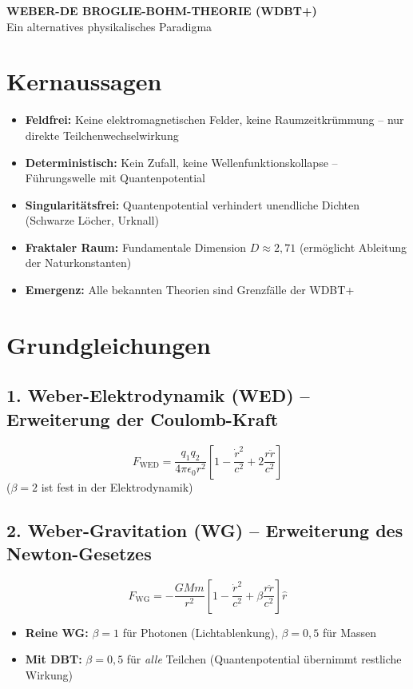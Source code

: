 \documentclass[12pt,a4paper]{article}
\begin{document}
\begin{center}
    \Large\textbf{WEBER-DE BROGLIE-BOHM-THEORIE (WDBT+)} \\
    \large{Ein alternatives physikalisches Paradigma}
\end{center}
\vspace{0.5cm}

\section*{Kernaussagen}
\begin{itemize}
    \item \textbf{Feldfrei:} Keine elektromagnetischen Felder, keine Raumzeitkrümmung -- nur direkte Teilchenwechselwirkung
    \item \textbf{Deterministisch:} Kein Zufall, keine Wellenfunktionskollapse -- Führungswelle mit Quantenpotential
    \item \textbf{Singularitätsfrei:} Quantenpotential verhindert unendliche Dichten (Schwarze Löcher, Urknall)
    \item \textbf{Fraktaler Raum:} Fundamentale Dimension $D \approx 2{,}71$ (ermöglicht Ableitung der Naturkonstanten)
    \item \textbf{Emergenz:} Alle bekannten Theorien sind Grenzfälle der WDBT+
\end{itemize}

\section*{Grundgleichungen}

\subsection*{1. Weber-Elektrodynamik (WED) -- Erweiterung der Coulomb-Kraft}
\begin{equation}
F_{\text{WED}} = \frac{q_1q_2}{4\pi\epsilon_0 r^2}\left[1 - \frac{\dot{r}^2}{c^2} + 2\frac{r\ddot{r}}{c^2}\right]
\end{equation}
($\beta = 2$ ist fest in der Elektrodynamik)

\subsection*{2. Weber-Gravitation (WG) -- Erweiterung des Newton-Gesetzes}
\begin{equation}
F_{\text{WG}} = -\frac{GMm}{r^2}\left[1 - \frac{\dot{r}^2}{c^2} + \beta\frac{r\ddot{r}}{c^2}\right] \hat{r}
\end{equation}
\begin{itemize}
    \item \textbf{Reine WG:} $\beta = 1$ für Photonen (Lichtablenkung), $\beta = 0{,}5$ für Massen
    \item \textbf{Mit DBT:} $\beta = 0{,}5$ für \textit{alle} Teilchen (Quantenpotential übernimmt restliche Wirkung)
\end{itemize}
\end{document}
